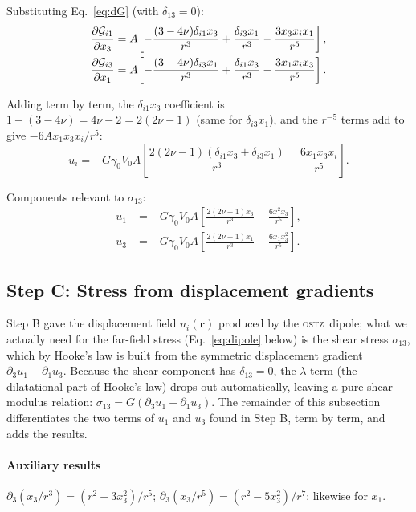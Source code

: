 \documentclass[3p]{elsarticle}
\newcommand{\OSTZ}{\textsc{ostz}}
\newcommand{\gz}{\gamma_0}
\begin{document}
Substituting Eq.~\eqref{eq:dG} (with $\delta_{13}=0$):
\begin{align}
  \frac{\partial\mathcal G_{i1}}{\partial x_3}
  &=A\!\left[-\frac{(3-4\nu)\delta_{i1}x_3}{r^3}
    +\frac{\delta_{i3}x_1}{r^3}-\frac{3x_3x_ix_1}{r^5}\right],
    \notag\\
  \frac{\partial\mathcal G_{i3}}{\partial x_1}
  &=A\!\left[-\frac{(3-4\nu)\delta_{i3}x_1}{r^3}
    +\frac{\delta_{i1}x_3}{r^3}-\frac{3x_1x_ix_3}{r^5}\right].
    \notag
\end{align}

Adding term by term, the $\delta_{i1}x_3$ coefficient is
$1-(3-4\nu)=4\nu-2=2(2\nu-1)$ (same for $\delta_{i3}x_1$),
and the $r^{-5}$ terms add to give $-6Ax_1x_3x_i/r^5$:
\begin{equation}
  u_i=-G\gz V_0 A\left[\frac{2(2\nu-1)(\delta_{i1}x_3+\delta_{i3}x_1)}{r^3}
  -\frac{6x_1x_3x_i}{r^5}\right].
  \label{eq:ui}
\end{equation}

Components relevant to $\sigma_{13}$:
\begin{align}
  u_1&=-G\gz V_0 A\!\left[\frac{2(2\nu-1)x_3}{r^3}
    -\frac{6x_1^2x_3}{r^5}\right],
    \label{eq:u1}\\
  u_3&=-G\gz V_0 A\!\left[\frac{2(2\nu-1)x_1}{r^3}
    -\frac{6x_1x_3^2}{r^5}\right].
    \label{eq:u3}
\end{align}

\subsection{Step C: Stress from displacement gradients}
\label{sec:stepC}

Step B gave the displacement field $u_i(\mathbf r)$ produced by the
\OSTZ\ dipole; what we actually need for the far-field stress
(Eq.~\eqref{eq:dipole} below) is the shear stress $\sigma_{13}$, which
by Hooke's law is built from the symmetric displacement gradient
$\partial_3u_1+\partial_1u_3$. Because the shear component has
$\delta_{13}=0$, the $\lambda$-term (the dilatational part of Hooke's
law) drops out automatically, leaving a pure shear-modulus relation:
$\sigma_{13}=G(\partial_3u_1+\partial_1u_3)$. The remainder of this
subsection differentiates the two terms of $u_1$ and $u_3$ found in
Step B, term by term, and adds the results.

\paragraph{Auxiliary results}
$\partial_3(x_3/r^3)=(r^2-3x_3^2)/r^5$;
$\partial_3(x_3/r^5)=(r^2-5x_3^2)/r^7$; likewise for $x_1$.
\end{document}
